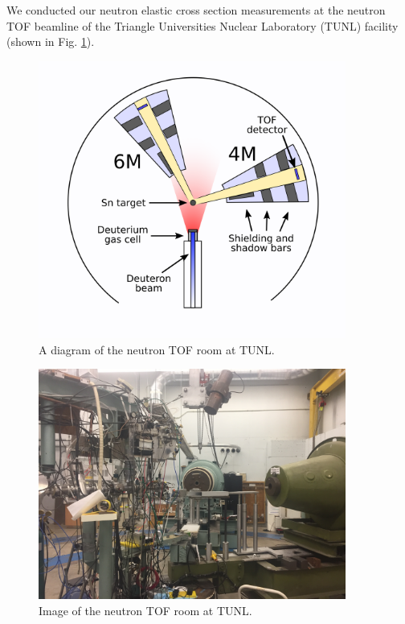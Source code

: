 We conducted our neutron elastic cross section measurements at the neutron TOF
beamline of the Triangle Universities Nuclear Laboratory (TUNL) facility
(shown in Fig. \ref{ExperimentalSetupTUNL}).

\begin{figure}
  \begin{center}
\includegraphics[width = 0.9\textwidth]{figures/ExperimentalSetupTUNL.png}
\caption{A diagram of the neutron TOF room at TUNL.} 
\label{ExperimentalSetupTUNL}
\end{center}
\end{figure}

\begin{figure}
  \begin{center}
\includegraphics[width = 0.9\textwidth]{figures/TOFRoomPhoto.jpg}
\caption{Image of the neutron TOF room at TUNL.} 
\label{TOFRoomPhoto}
\end{center}
\end{figure}

